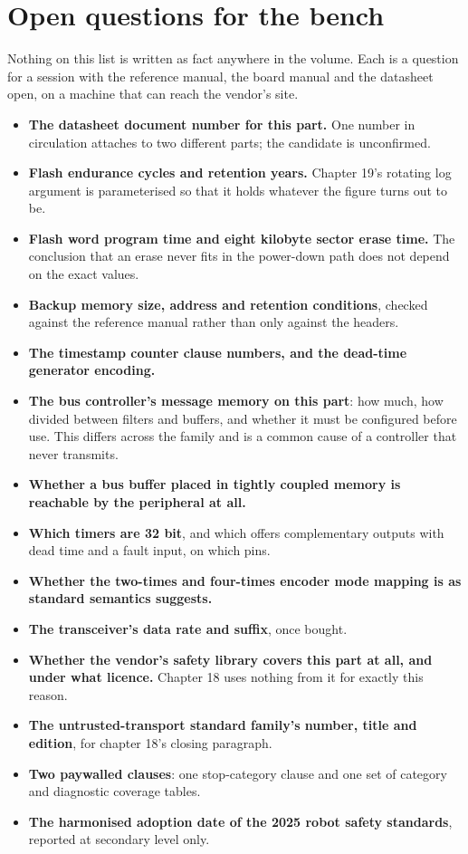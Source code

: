 \section{Open questions for the bench}

Nothing on this list is written as fact anywhere in the volume. Each is a
question for a session with the reference manual, the board manual and the
datasheet open, on a machine that can reach the vendor's site.

\begin{itemize}[itemsep=2pt]
\item \textbf{The datasheet document number for this part.} One number in
circulation attaches to two different parts; the candidate is unconfirmed.
\item \textbf{Flash endurance cycles and retention years.} Chapter 19's rotating
log argument is parameterised so that it holds whatever the figure turns out to
be.
\item \textbf{Flash word program time and eight kilobyte sector erase time.} The
conclusion that an erase never fits in the power-down path does not depend on
the exact values.
\item \textbf{Backup memory size, address and retention conditions}, checked
against the reference manual rather than only against the headers.
\item \textbf{The timestamp counter clause numbers, and the dead-time generator
encoding.}
\item \textbf{The bus controller's message memory on this part}: how much, how
divided between filters and buffers, and whether it must be configured before
use. This differs across the family and is a common cause of a controller that
never transmits.
\item \textbf{Whether a bus buffer placed in tightly coupled memory is reachable
by the peripheral at all.}
\item \textbf{Which timers are 32 bit}, and which offers complementary outputs
with dead time and a fault input, on which pins.
\item \textbf{Whether the two-times and four-times encoder mode mapping is as
standard semantics suggests.}
\item \textbf{The transceiver's data rate and suffix}, once bought.
\item \textbf{Whether the vendor's safety library covers this part at all, and
under what licence.} Chapter 18 uses nothing from it for exactly this reason.
\item \textbf{The untrusted-transport standard family's number, title and
edition}, for chapter 18's closing paragraph.
\item \textbf{Two paywalled clauses}: one stop-category clause and one set of
category and diagnostic coverage tables.
\item \textbf{The harmonised adoption date of the 2025 robot safety standards},
reported at secondary level only.
\end{itemize}


